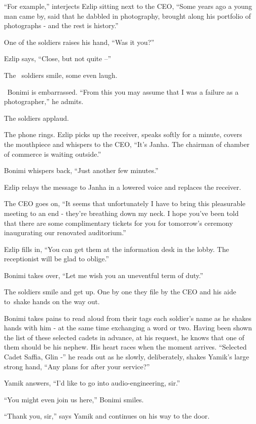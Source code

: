 \documentclass[twoside,11pt]{book}
\begin{document}
``For example,'' interjects Ezlip sitting next to the CEO, ``Some years ago a
young man came by, said that he dabbled in photography, brought along his portfolio of photographs - and the rest is
history.''

One of the soldiers raises his hand, ``Was it you?'' \

Ezlip says, ``Close, but not quite --''

The \ soldiers smile, some even laugh{.}

~Bonimi is embarrassed. ``From this you may assume that I was a failure as a photographer,''
he admits.

The soldiers applaud.~

The phone rings. Ezlip picks up the receiver, speaks softly for a minute, covers the mouthpiece and whispers to the CEO,
``It's Janha. The chairman of chamber of commerce is waiting outside.''

Bonimi whispers back, ``Just another few minutes.''

Ezlip relays the message to Janha in a lowered voice and replaces the receiver.

The CEO goes on, ``It seems that unfortunately I have to bring this pleasurable meeting to an end - they're
breathing down my neck. I hope you've been told that there are some complimentary tickets for you for
tomorrow's{ }ceremony inaugurating our renovated auditorium.''

Ezlip fills in, ``You can get them at the information desk in the lobby. The receptionist will be glad to
oblige.''

Bonimi takes over, ``Let me wish you an uneventful term of duty.''

The soldiers smile and get up. One by one they file by the CEO and his aide to~shake hands on the way out.

Bonimi takes pains{ }to read aloud{
}from their tags each soldier's name as he shakes hands with him - at the same time exchanging a word or two. Having
been{ }shown the list of these selected cadets in advance, at his request, he
knows that one of them should be his nephew. His heart races when the moment arrives. ``Selected Cadet Saffia, Glin -''
he reads out as he slowly, deliberately, shakes Yamik's large strong{ }hand,
``Any plans for after your service?''

Yamik answers, ``I'd like to go into audio-engineering, sir.''

``You might even join us here,'' Bonimi smiles.

``Thank you, sir,'' says Yamik and continues on his way to the door.
\end{document}
